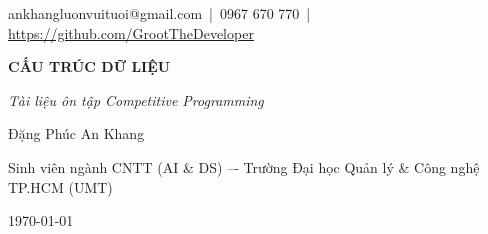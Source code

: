 \begin{titlepage}
\thispagestyle{empty}
\centering

\vspace*{1cm}

{\large ankhangluonvuituoi@gmail.com \,|\, 0967 670 770 \,|\, \url{https://github.com/GrootTheDeveloper}}\\[3.5cm]

{\fontsize{36}{40}\selectfont\bfseries CẤU TRÚC DỮ LIỆU\par} 
\vspace{0.6cm}
{\fontsize{18}{22}\selectfont\itshape Tài liệu ôn tập Competitive Programming \par}
\vspace{5cm}

{\Large Đặng Phúc An Khang\par}
\vspace{0.4cm}
{\large Sinh viên ngành CNTT (AI \& DS) –- Trường Đại học Quản lý \& Công nghệ TP.HCM (UMT)\par}
\vspace{1.2cm}

\vspace{10cm}

{\Large \today\par}

\vfill
\end{titlepage}
